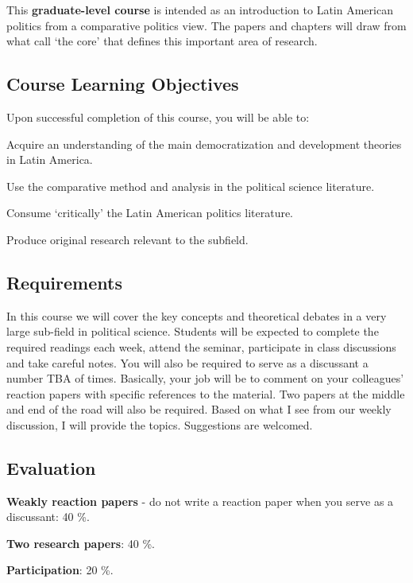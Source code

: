 \documentclass[letterpaper]{article}
\renewenvironment{itemize}{
  \begin{list}{}{
    \setlength{\leftmargin}{1.5em}
  }
}{
  \end{list}
}
\begin{document}
This {\bf {\color{blue}graduate-level course}} is intended as an introduction to Latin American politics from a comparative politics view. The papers and chapters will draw from what call `the core' that defines this important area of research. 



\subsection*{Course Learning Objectives}
 
Upon successful completion of this course, you will be able to:

\begin{itemize}
	\item[$\bullet$] Acquire an understanding of the main democratization and development theories in Latin America.
	\item[$\bullet$] Use the comparative method and analysis in the political science literature.
	\item[$\bullet$] Consume `critically' the Latin American politics literature.
	\item[$\bullet$] Produce original research relevant to the subfield.
\end{itemize}



\subsection*{Requirements}

In this course we will cover the key concepts and theoretical debates in a very large sub-field in political science. Students will be expected to complete the required readings each week, attend the seminar, participate in class discussions and take careful notes. You will also be required to serve as a discussant a number TBA of times. Basically, your job will be to comment on your colleagues' reaction papers with specific references to the material. Two papers at the middle and end of the road will also be required. Based on what I see from our weekly discussion, I will provide the topics. Suggestions are welcomed.


\subsection*{Evaluation}


\begin{itemize}
	\item[$\bullet$] {\bf Weakly reaction papers} - do not write a reaction paper when you serve as a discussant: 40 \%.
	\item[$\bullet$] {\bf Two research papers}: 40 \%.
	\item[$\bullet$] {\bf Participation}: 20 \%.
\end{itemize}
\end{document}
